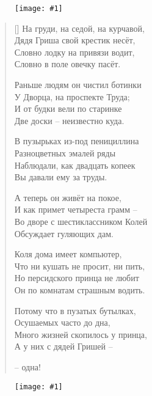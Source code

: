 \documentclass[12pt,a5paper,twoside]{article}
\newcommand{\pict}[1]{\thispagestyle{empty}\begin{figure}[H]\begin{center}\texttt{[image: \#1]}\end{center}\end{figure}\newpage}
\begin{document}
\pict{picts/Gestokiy_romans1.png} 
\settowidth{\versewidth}{На груди, на седой, на курчавой,}
\begin{verse}[\versewidth]
На груди, на седой, на курчавой,\\
Дядя Гриша свой крестик несёт,\\
Словно лодку на привязи водит,\\
Словно в поле овечку пасёт.

Раньше людям он чистил ботинки\\
У Дворца, на проспекте Труда;\\
И от будки вели по старинке\\
Две доски – неизвестно куда.

В пузырьках из-под пенициллина\\
Разноцветных эмалей ряды\\
Наблюдали, как двадцать копеек\\
Вы давали ему за труды.

А теперь он живёт на покое,\\
И как примет четыреста грамм –\\
Во дворе с шестиклассником Колей\\
Обсуждает гуляющих дам.

Коля дома имеет компьютер,\\
Что ни кушать не просит, ни пить,\\
Но персидского принца не любит\\
Он по комнатам страшным водить.

Потому что в пузатых бутылках,\\
Осушаемых часто до дна,\\
Много жизней скопилось у принца,\\
А у них с дядей Гришей –\\
\begin{minipage}{0.45\textwidth}
\begin{flushright}
		– одна!
\end{flushright}
\end{minipage}
\end{verse}

\newpage
\pict{picts/Kto_raspryag1.png} 
\end{document}
